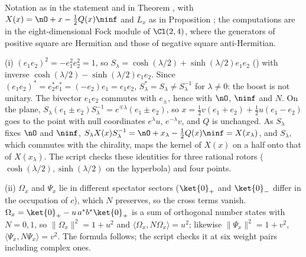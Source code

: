 Notation as in the statement and in Theorem , with $X(x) = \nO + x - \tfrac12 Q(x)\ninf$ and $L_{x}$ as in Proposition ; the computations are in the eight-dimensional Fock module of $\Cl(2,4)$, where the generators of positive square are Hermitian and those of negative square anti-Hermitian.

(i) $(e_{1}e_{2})^{2} = -e_{1}^{2}e_{2}^{2} = 1$, so $S_{\lambda} = \cosh(\lambda/2) + \sinh(\lambda/2)e_{1}e_{2}$ () with inverse $\cosh(\lambda/2) - \sinh(\lambda/2)e_{1}e_{2}$. Since $(e_{1}e_{2})^{*} = e_{2}^{*}e_{1}^{*} = (-e_{2})e_{1} = e_{1}e_{2}$, $S_{\lambda}^{*} = S_{\lambda} \ne S_{\lambda}^{-1}$ for $\lambda \ne 0$: the boost is not unitary. The bivector $e_{1}e_{2}$ commutes with $e_{\pm}$, hence with $\nO$, $\ninf$ and $N$. On the plane, $S_{\lambda}(e_{1} \pm e_{2})S_{\lambda}^{-1} = e^{\mp\lambda}(e_{1} \pm e_{2})$, so $x = \tfrac12 v(e_{1} + e_{2}) + \tfrac12 u(e_{1} - e_{2})$ goes to the point with null coordinates $e^{\lambda}u$, $e^{-\lambda}v$, and $Q$ is unchanged. As $S_{\lambda}$ fixes $\nO$ and $\ninf$, $S_{\lambda}X(x)S_{\lambda}^{-1} = \nO + x_{\lambda} - \tfrac12 Q(x)\ninf = X(x_{\lambda})$, and $S_{\lambda}$, which commutes with the chirality, maps the kernel of $X(x)$ on a half onto that of $X(x_{\lambda})$. The script checks these identities for three rational rotors ($\cosh(\lambda/2), \sinh(\lambda/2)$ on the hyperbola) and four points.

(ii) $\Omega_{x}$ and $\Psi_{x}$ lie in different spectator sectors ($\ket{0}_{+}$ and $\ket{0}_{-}$ differ in the occupation of $c$), which $N$ preserves, so the cross terms vanish. $\Omega_{x} = \ket{0}_{+} - u\,a^{*}b^{*}\ket{0}_{+}$ is a sum of orthogonal number states with $N = 0, 1$, so $\|\Omega_{x}\|^{2} = 1 + u^{2}$ and $\langle\Omega_{x}, N\Omega_{x}\rangle = u^{2}$; likewise $\|\Psi_{x}\|^{2} = 1 + v^{2}$, $\langle\Psi_{x}, N\Psi_{x}\rangle = v^{2}$. The formula follows; the script checks it at six weight pairs including complex ones.

